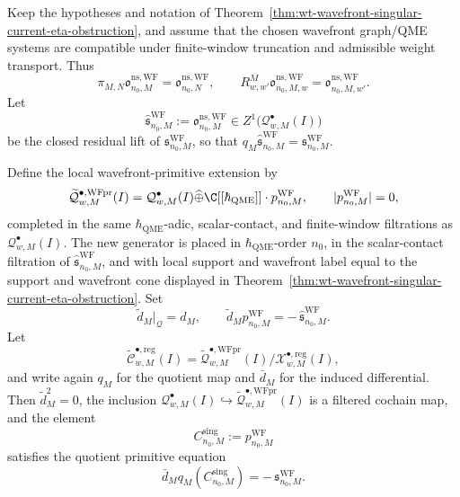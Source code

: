 \begin{thm}
\label{thm:wt-wavefront-distributional-primitive-cone}
  Keep the hypotheses and notation of
  Theorem~\ref{thm:wt-wavefront-singular-current-eta-obstruction}, and
  assume that the chosen wavefront graph/QME systems are compatible under
  finite-window truncation and admissible weight transport.  Thus
  \[
    \pi_{M,N}\mathfrak o^{\mathrm{ns,WF}}_{n_0,M}
      =
    \mathfrak o^{\mathrm{ns,WF}}_{n_0,N},
    \qquad
    R^M_{w,w'}\mathfrak o^{\mathrm{ns,WF}}_{n_0,M,w}
      =
    \mathfrak o^{\mathrm{ns,WF}}_{n_0,M,w'} .
  \]
  Let
  \[
    \widehat{\mathfrak s}^{\mathrm{WF}}_{n_0,M}
      :=
    \mathfrak o^{\mathrm{ns,WF}}_{n_0,M}
      \in Z^1\bigl(\mathcal Q^\bullet_{w,M}(I)\bigr)
  \]
  be the closed residual lift of
  \(\mathfrak s^{\mathrm{WF}}_{n_0,M}\), so that
  \(q_M\widehat{\mathfrak s}^{\mathrm{WF}}_{n_0,M}
  =\mathfrak s^{\mathrm{WF}}_{n_0,M}\).

  Define the local wavefront-primitive extension by
  \[
    \widetilde{\mathcal Q}^{\bullet,\mathrm{WFpr}}_{w,M}(I)
      =
    \mathcal Q^\bullet_{w,M}(I)
      \widehat{\oplus}
    \C[[\hbar_{\mathrm{QME}}]]\cdot p^{\mathrm{WF}}_{n_0,M},
    \qquad |p^{\mathrm{WF}}_{n_0,M}|=0,
  \]
  completed in the same \(\hbar_{\mathrm{QME}}\)-adic, scalar-contact, and
  finite-window filtrations as \(\mathcal Q^\bullet_{w,M}(I)\).  The new
  generator is placed in \(\hbar_{\mathrm{QME}}\)-order \(n_0\), in the scalar-contact
  filtration of \(\widehat{\mathfrak s}^{\mathrm{WF}}_{n_0,M}\), and with
  local support and wavefront label equal to the support and wavefront
  cone displayed in
  Theorem~\ref{thm:wt-wavefront-singular-current-eta-obstruction}.  Set
  \[
    \widetilde d_M|_{\mathcal Q}=d_M,\qquad
    \widetilde d_Mp^{\mathrm{WF}}_{n_0,M}
      =
    -\,\widehat{\mathfrak s}^{\mathrm{WF}}_{n_0,M}.
  \]
  Let
  \[
    \widetilde{\mathcal C}^{\bullet,\mathrm{reg}}_{w,M}(I)
      =
    \widetilde{\mathcal Q}^{\bullet,\mathrm{WFpr}}_{w,M}(I)/
    \mathcal X^{\bullet,\mathrm{reg}}_{w,M}(I),
  \]
  and write again \(q_M\) for the quotient map and
  \(\bar d_M\) for the induced differential.  Then
  \(\widetilde d_M^2=0\), the inclusion
  \(\mathcal Q^\bullet_{w,M}(I)\hookrightarrow
  \widetilde{\mathcal Q}^{\bullet,\mathrm{WFpr}}_{w,M}(I)\) is a
  filtered cochain map, and the element
  \[
    C^{\mathrm{sing}}_{n_0,M}:=p^{\mathrm{WF}}_{n_0,M}
  \]
  satisfies the quotient primitive equation
  \[
    \bar d_Mq_M(C^{\mathrm{sing}}_{n_0,M})
      =
    -\,\mathfrak s^{\mathrm{WF}}_{n_0,M}.
  \]


\end{thm}
